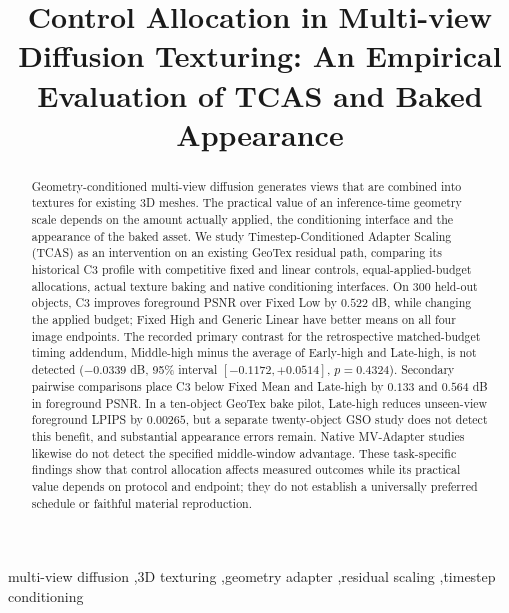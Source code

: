 \documentclass[times,twocolumn,final]{elsarticle}
\begin{document}
\begin{frontmatter}

\title{Control Allocation in Multi-view Diffusion Texturing: An Empirical Evaluation of TCAS and Baked Appearance}


\begin{abstract}
Geometry-conditioned multi-view diffusion generates views that are combined into textures for existing 3D meshes. The practical value of an inference-time geometry scale depends on the amount actually applied, the conditioning interface and the appearance of the baked asset. We study Timestep-Conditioned Adapter Scaling (TCAS) as an intervention on an existing GeoTex residual path, comparing its historical C3 profile with competitive fixed and linear controls, equal-applied-budget allocations, actual texture baking and native conditioning interfaces. On 300 held-out objects, C3 improves foreground PSNR over Fixed Low by $0.522$ dB, while changing the applied budget; Fixed High and Generic Linear have better means on all four image endpoints. The recorded primary contrast for the retrospective matched-budget timing addendum, Middle-high minus the average of Early-high and Late-high, is not detected ($-0.0339$ dB, 95\% interval $[-0.1172,+0.0514]$, $p=0.4324$). Secondary pairwise comparisons place C3 below Fixed Mean and Late-high by $0.133$ and $0.564$ dB in foreground PSNR. In a ten-object GeoTex bake pilot, Late-high reduces unseen-view foreground LPIPS by $0.00265$, but a separate twenty-object GSO study does not detect this benefit, and substantial appearance errors remain. Native MV-Adapter studies likewise do not detect the specified middle-window advantage. These task-specific findings show that control allocation affects measured outcomes while its practical value depends on protocol and endpoint; they do not establish a universally preferred schedule or faithful material reproduction.
\end{abstract}

\begin{keyword}
\KWD
multi-view diffusion \sep 3D texturing \sep geometry adapter \sep residual scaling \sep timestep conditioning
\end{keyword}

\end{frontmatter}

\raggedbottom
\linenumbers
\end{document}
